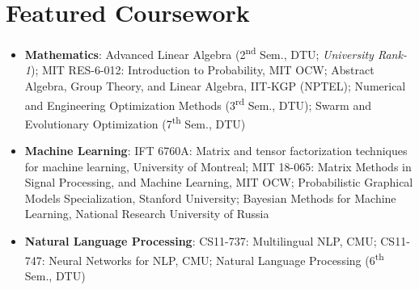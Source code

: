 \documentclass[10pt,letterpaper]{article}
\begin{document}
\section*{Featured Coursework}
\begin{itemize}
    \item \textbf{Mathematics}: Advanced Linear Algebra (2\textsuperscript{nd} Sem., DTU; \textit{University Rank-1}); MIT RES-6-012: Introduction to Probability, MIT OCW; Abstract Algebra, Group Theory, and Linear Algebra, IIT-KGP (NPTEL); Numerical and Engineering Optimization Methods (3\textsuperscript{rd} Sem., DTU); Swarm and Evolutionary Optimization (7\textsuperscript{th} Sem., DTU)
    \item \textbf{Machine Learning}: IFT 6760A: Matrix and tensor factorization techniques for machine learning, University of Montreal; MIT 18-065: Matrix Methods in Signal Processing, and Machine Learning, MIT OCW; Probabilistic Graphical Models Specialization, Stanford University; Bayesian Methods for Machine Learning, National Research University of Russia
    \item \textbf{Natural Language Processing}: CS11-737: Multilingual NLP, CMU; CS11-747: Neural Networks for NLP, CMU; Natural Language Processing (6\textsuperscript{th} Sem., DTU)
\end{itemize}
\end{document}
